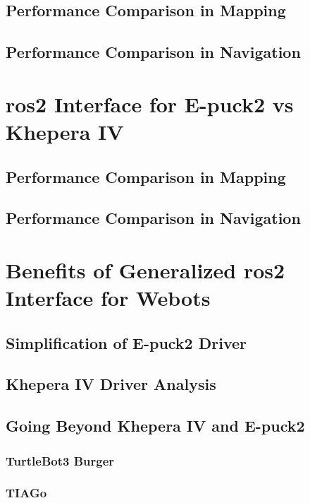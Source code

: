 \subsection{Performance Comparison in Mapping}
\subsection{Performance Comparison in Navigation}

\section{\ac{ros2} Interface for E-puck2 vs Khepera IV}
\subsection{Performance Comparison in Mapping}
\subsection{Performance Comparison in Navigation}

\section{Benefits of Generalized \ac{ros2} Interface for Webots}
\subsection{Simplification of E-puck2 Driver}
\subsection{Khepera IV Driver Analysis}
\subsection{Going Beyond Khepera IV and E-puck2}
\subsubsection{TurtleBot3 Burger}
\subsubsection{TIAGo}
